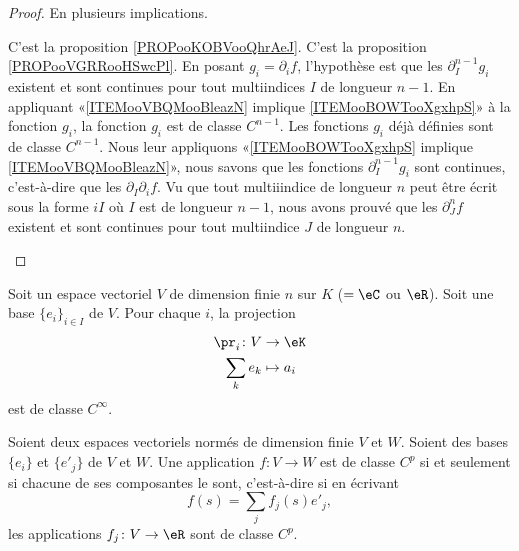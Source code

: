 \begin{proof}
	En plusieurs implications.
	\begin{subproof}
		C'est la proposition \ref{PROPooKOBVooQhrAeJ}.
		C'est la proposition \ref{PROPooVGRRooHSwcPl}.
		En posant \( g_i=\partial_if\), l'hypothèse est que les \( \partial^{n-1}_Ig_i\) existent et sont continues pour tout multiindices \( I\) de longueur \( n-1\). En appliquant «\ref{ITEMooVBQMooBleazN} implique \ref{ITEMooBOWTooXgxhpS}» à la fonction \( g_i\), la fonction \( g_i\) est de classe \( C^{n-1}\).
		Les fonctions \( g_i\) déjà définies sont de classe \( C^{n-1}\). Nous leur appliquons «\ref{ITEMooBOWTooXgxhpS} implique \ref{ITEMooVBQMooBleazN}», nous savons que les fonctions \( \partial^{n-1}_Ig_i\) sont continues, c'est-à-dire que les \( \partial_I\partial_if\). Vu que tout multiiindice de longueur \( n\) peut être écrit sous la forme \( iI\) où \( I\) est de longueur \( n-1\), nous avons prouvé que les \( \partial^n_Jf\) existent et sont continues pour tout multiindice \( J\) de longueur \( n\).
	\end{subproof}
\end{proof}

\begin{proposition}		\label{PROPooCKROooYutfEX}
	Soit un espace vectoriel \( V\) de dimension finie \( n\) sur \( K\) (\( =\eC\) ou \( \eR\)). Soit une base \( \{ e_i \}_{i\in I}\) de \( V\). Pour chaque \( i\), la projection
	\begin{equation}
		\begin{aligned}
			\pr_i\colon V & \to \eK     \\
			\sum_ke_k     & \mapsto a_i
		\end{aligned}
	\end{equation}
	est de classe \( C^{\infty}\).
\end{proposition}

\ssdem

\begin{proposition}		\label{PROPooMOMMooDYIayv}
	Soient deux espaces vectoriels normés de dimension finie \( V\) et \( W\). Soient des bases \( \{ e_i \}\) et \( \{ e'_j \}\) de \( V\) et \( W\). Une application \(f \colon V\to W  \) est de classe \( C^p\) si et seulement si chacune de ses composantes le sont, c'est-à-dire si en écrivant
	\begin{equation}
		f(s)=\sum_jf_j(s)e'_j,
	\end{equation}
	les applications \(f_j \colon V\to \eR  \) sont de classe \( C^p\).
\end{proposition}


